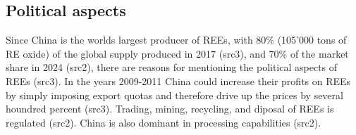 \subsection{Political aspects}

Since China is the worlds largest producer of REEs, with 80\% (105'000 tons of RE oxide) of the global supply produced in 2017 (src3), and 70\% of the market share in 2024 (src2), there are reasons for mentioning the political aspects of REEs (src3). In the years 2009-2011 China could increase their profits on REEs by simply imposing export quotas and therefore drive up the prices by several houndred percent (src3). Trading, mining, recycling, and diposal of REEs is regulated (src2). China is also dominant in processing capabilities (src2).